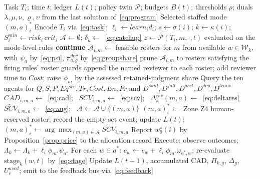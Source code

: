 \documentclass[utf8]{FrontiersinHarvard}
\begin{document}
	\begin{algorithm}[H]
		\caption{Online policy-aware allocation over staffed modes}
		\label{alg:scv}
		\begin{algorithmic}[1]
			\Require Task $T_i$; time $t$; ledger $L(t)$; policy twin $\mathcal{P}$; budgets $B(t)$; thresholds $\rho$; duals $\lambda,\mu,\nu,\varrho,\upsilon$ from the last solution of~\eqref{eq:program}
			\Ensure Selected staffed mode $(m,a)^\ast_i$
			\State Encode $T_i$ via~\eqref{eq:task}; $\ell_i \gets learn_i d_i$; $s \gets \sigma(i)$; $k \gets \kappa(i)$; $S^{min}_i \gets risk_i\,crit_i$
			\State $\mathcal{A} \gets \emptyset$; $\delta_k \gets$~\eqref{eq:catchup}
			\State $z \gets \mathcal{P}(T_i,m,\cdot,t)$ evaluated on the mode-level rules 
			 \State \textbf{continue} \EndIf
			\State $\mathcal{A}_{i,m} \gets$ feasible rosters for $m$ from available $w\in\mathcal{W}_k$, with $\psi_a$ by~\eqref{eq:psi}, $\pi^{dev}_{a,g}$ by~\eqref{eq:groupshare}
			 \State prune $\mathcal{A}_{i,m}$ to rosters satisfying the firing rules' roster guards \EndIf
			 \State append the named reviewer to each roster; add reviewer time to $Cost$; raise $\phi_m$ by the assessed retained-judgment share \EndIf
			\State Query the ten agents for $Q,S,P,Eq^{srv},Tr,Cost,En,Pr$ and $D^{skill},D^{fall},D^{acct},D^{dep},D^{trans}$
			\State $CAD_{i,m,a} \gets$~\eqref{eq:cad}; \ $SCV_{i,m,a} \gets$~\eqref{eq:scv}; \ $\Delta^{res}_s(m,a) \gets$~\eqref{eq:deltares}
			\State $\widetilde{SCV}_{i,m,a} \gets$~\eqref{eq:aug}; \ $\mathcal{A} \gets \mathcal{A}\cup\{(m,a)\}$
			\EndIf
			\EndFor
			\EndFor
			\State $(m,a)^\ast_i \gets$ Zone Z4 human-reserved roster; record the empty-set event; update $L(t)$; \Return
			\EndIf
			\State $(m,a)^\ast_i \gets \arg\max_{(m,a) \in \mathcal{A}} \widetilde{SCV}_{i,m,a}$ 
			\State Report $w_9^\star(i)$ by Proposition~\ref{prop:price} to the allocation record
			\State Execute; observe outcomes; $\Lambda_k \gets \Lambda_k + \ell_i \phi_{m^\ast}\psi_{a^\ast}$
			\State For each $w \in a^\ast$: $c_w \gets c_w + \ell_i \phi_{m^\ast}\omega_{a^\ast,w}$; re-evaluate $\mathrm{stage}_k(w,t)$ by~\eqref{eq:stage}
			\State Update $L(t{+}1)$, accumulated CAD, $\Pi_{k,g}$, $\Delta_g$, $U^{used}_r$; emit to the feedback bus via~\eqref{eq:feedback}
		\end{algorithmic}
	\end{algorithm}
\end{document}
